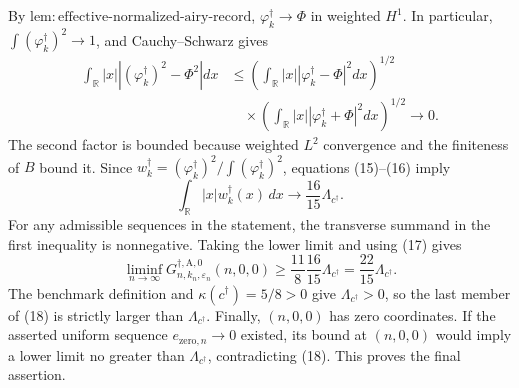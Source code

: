 By \(\mathrm{lem:effective\text{-}normalized\text{-}airy\text{-}record}\),
\(\varphi_k^\dagger\to\Phi\) in weighted \(H^1\).  In particular,
\(\int(\varphi_k^\dagger)^2\to1\), and Cauchy--Schwarz gives
\[
\begin{aligned}
\int_{\mathbb R}|x|
\left|(\varphi_k^\dagger)^2-\Phi^2\right|dx
&\leq
\left(\int_{\mathbb R}|x|
|\varphi_k^\dagger-\Phi|^2dx\right)^{1/2}\\
&\quad\times
\left(\int_{\mathbb R}|x|
|\varphi_k^\dagger+\Phi|^2dx\right)^{1/2}
\longrightarrow0.
\end{aligned}
\tag{16}
\]
The second factor is bounded because weighted \(L^2\) convergence and the finiteness of \(B\) bound it.  Since
\(w_k^\dagger=(\varphi_k^\dagger)^2/
\int(\varphi_k^\dagger)^2\), equations (15)--(16) imply
\[
\int_{\mathbb R}|x|w_k^\dagger(x)\,dx
\longrightarrow\frac{16}{15}\Lambda_{c^\dagger}.
\tag{17}
\]
For any admissible sequences in the statement, the transverse summand in the first inequality is nonnegative.  Taking the lower limit and using (17) gives
\[
\liminf_{n\to\infty}
G_{n,k_n,\varepsilon_n}^{\dagger,\mathrm A,0}(n,0,0)
\geq\frac{11}{8}\frac{16}{15}\Lambda_{c^\dagger}
=\frac{22}{15}\Lambda_{c^\dagger}.
\tag{18}
\]
The benchmark definition and \(\kappa(c^\dagger)=5/8>0\) give
\(\Lambda_{c^\dagger}>0\), so the last member of (18) is strictly larger than \(\Lambda_{c^\dagger}\).  Finally, \((n,0,0)\) has zero coordinates.  If the asserted uniform sequence \(e_{\mathrm{zero},n}\to0\) existed, its bound at \((n,0,0)\) would imply a lower limit no greater than \(\Lambda_{c^\dagger}\), contradicting (18).  This proves the final assertion.
